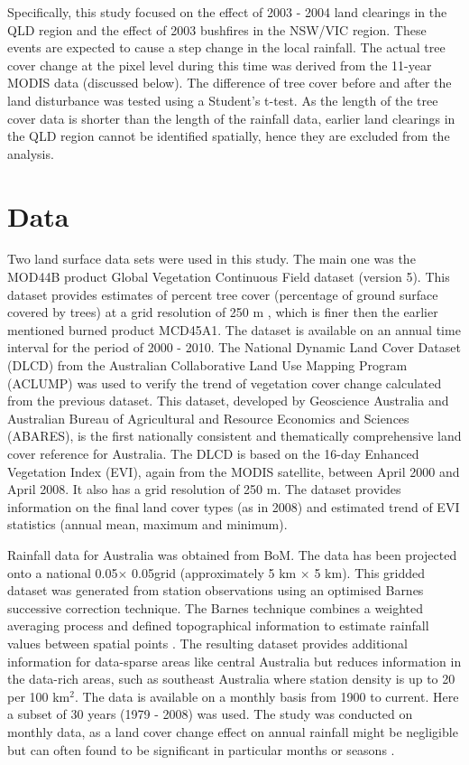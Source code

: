 \documentclass[authoryear,preprint,review,12pt]{elsarticle}
\begin{document}
Specifically, this study focused on the effect of 2003 - 2004 land clearings in the QLD region and the effect of 2003 bushfires in the NSW/VIC region. These events are expected to cause a step change in the local rainfall. The actual tree cover change at the pixel level during this time was derived from the 11-year MODIS data (discussed below). The difference of tree cover before and after the land disturbance was tested using a Student's t-test. As the length of the tree cover data is shorter than the length of the rainfall data, earlier land clearings in the QLD region cannot be identified spatially, hence they are excluded from the analysis.

\section{Data}
\label{sec:Data}

Two land surface data sets were used in this study. The main one was the MOD44B product Global Vegetation Continuous Field dataset (version 5). This dataset provides estimates of percent tree cover (percentage of ground surface covered by trees) at a grid resolution of 250 m \citep{Townshend2011}, which is finer then the earlier mentioned burned product MCD45A1. The dataset is available on an annual time interval for the period of 2000 - 2010. The National Dynamic Land Cover Dataset (DLCD) \citep{Lymburner2010} from the Australian Collaborative Land Use Mapping Program (ACLUMP) was used to verify the trend of vegetation cover change calculated from the previous dataset. This dataset, developed by Geoscience Australia and Australian Bureau of Agricultural and Resource Economics and Sciences (ABARES), is the first nationally consistent and thematically comprehensive land cover reference for Australia. The DLCD is based on the 16-day Enhanced Vegetation Index (EVI), again from the MODIS satellite, between April 2000 and April 2008. It also has a grid resolution of 250 m. The dataset provides information on the final land cover types (as in 2008) and estimated trend of EVI statistics (annual mean, maximum and minimum). 

Rainfall data for Australia \citep{Jones2009} was obtained from BoM. The data has been projected onto a national 0.05\textdegree $\times$ 0.05\textdegree grid (approximately 5 km $\times$ 5 km). This gridded dataset was generated from station observations using an optimised Barnes successive correction technique. The Barnes technique combines a weighted averaging process and defined topographical information to estimate rainfall values between spatial points \citep{BoM2009}. The resulting dataset provides additional information for data-sparse areas like central Australia but reduces information in the data-rich areas, such as southeast Australia where station density is up to 20 per 100 km$^2$. The data is available on a monthly basis from 1900 to current. Here a subset of 30 years (1979 - 2008) was used. The study was conducted on monthly data, as a land cover change effect on annual rainfall might be negligible but can often found to be significant in particular months or seasons \citep[e.g.][]{Otterman1990,Gaertner2001,Semazzi2001,Oleson2004,Deo2009}. 
\end{document}
